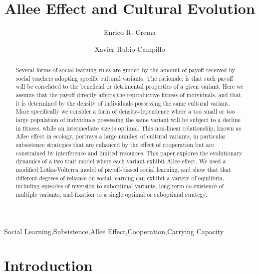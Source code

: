 \documentclass[preprint,authoryear]{elsarticle}
\begin{document}
\begin{frontmatter}

\title{Allee Effect and Cultural Evolution}


\author[label1,label2]{Enrico R. Crema}
\author[label3]{Xavier Rubio-Campillo}

\address[label1]{CaSEs - Complexity and Socio-Ecological Dynamics Research Group, Barcelona}
\address[label2]{UCL Institute of Archaeology}
\address[label3]{BSC - Barcelona Supercomputing Center}



\begin{abstract}
Several forms of social learning rules are guided by the amount of payoff received by social teachers adopting specific cultural variants. The rationale, is that such payoff will be correlated to the beneficial or detrimental properties of a given variant. Here we assume that the payoff directly affects the reproductive fitness of individuals, and that it is determined by the density of individuals possessing the same cultural variant. More specifically we consider a  form of density-dependence where a too small or too large population of individuals possessing the same variant will be subject to a decline in fitness, while an intermediate size is optimal. This non-linear relationship, known as Allee effect in ecology, portrays a large number of cultural variants, in particular subsistence strategies that are enhanced  by the effect of cooperation but are constrained by interference and limited resources. This paper explores the evolutionary dynamics of a two trait model where each variant exhibit Allee effect. We used a modified Lotka-Volterra model of payoff-biased social learning, and show that that different degrees of reliance on social learning can exhibit a variety of equilibria, including episodes of reversion to suboptimal variants, long-term co-existence of multiple variants, and fixation to a single optimal or suboptimal strategy.
\end{abstract}

\begin{keyword}
Social Learning\sep Subsistence\sep Allee Effect\sep Cooperation\sep Carrying Capacity
\end{keyword}

\end{frontmatter}

\section{Introduction}
\end{document}
